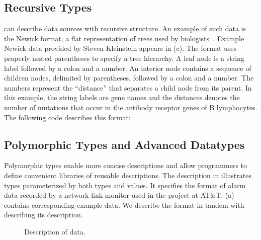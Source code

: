 \subsection{Recursive Types}

\padsml{} can describe data sources with recursive structure.  An
example of such data is the Newick format, a flat representation
of trees used by biologists~\cite{newick}.
Example Newick data provided by Steven Kleinstein appears in
(c). 
The format uses properly nested
parentheses to specify a tree hierarchy.  A leaf node is a string
label followed by a colon and a number.  An interior node contains a
sequence of children nodes, delimited by parentheses, followed by a
colon and a number.  The numbers represent the ``distance'' that
separates a child node from its parent. 
In this example,  the string labels are gene names and the distances denotes the number of mutations that occur in the antibody receptor genes of B lymphocytes. 
The following \padsml{} code 
describes this format:

 

\subsection{Polymorphic Types and Advanced Datatypes}

Polymorphic types enable more concise descriptions and allow
programmers to define convenient libraries of reusable descriptions. The
description in  illustrates types
parameterized by both types and values.  It specifies
the format of alarm data recorded by a network-link monitor used in
the \darkstar{} project at AT\&T.  (a) contains corresponding example data. We describe the format in tandem with describing its \padsml{} description.
\begin{figure}
  \centering
  
  \caption{Description of \darkstar{} data.}
  \label{fig:darkstar-ml}
\end{figure}

